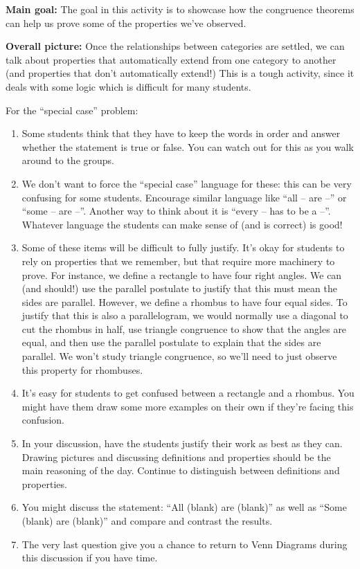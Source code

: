 \documentclass[nooutcomes,noauthor, handout]{ximera}
\begin{document}
\pagebreak

\begin{instructorNotes}
{\bf Main goal: } The goal in this activity is to showcase how the congruence theorems can help us prove some of the properties we've observed.


{\bf Overall picture:} Once the relationships between categories are settled, we can talk about properties that automatically extend from one category to another (and properties that don't automatically extend!)  This is a tough activity, since it deals with some logic which is difficult for many students.

For the ``special case'' problem:
\begin{enumerate}
\item Some students think that they have to keep the words in order and answer whether the statement is true or false.  You can watch out for this as you walk around to the groups.
\item We don't want to force the ``special case'' language for these: this can be very confusing for some students. Encourage similar language like ``all -- are --'' or ``some -- are --''. Another way to think about it is ``every -- has to be a --''. Whatever language the students can make sense of (and is correct) is good!
\item Some of these items will be difficult to fully justify. It's okay for students to rely on properties that we remember, but that require more machinery to prove. For instance, we define a rectangle to have four right angles. We can (and should!) use the parallel postulate to justify that this must mean the sides are parallel. However, we define a rhombus to have four equal sides. To justify that this is also a parallelogram, we would normally use a diagonal to cut the rhombus in half, use triangle congruence to show that the angles are equal, and then use the parallel postulate to explain that the sides are parallel. We won't study triangle congruence, so we'll need to just observe this property for rhombuses.
\item It's easy for students to get confused between a rectangle and a rhombus.  You might have them draw some more examples on their own if they're facing this confusion.
\item In your discussion, have the students justify their work as best as they can. Drawing pictures and discussing definitions and properties should be the main reasoning of the day. Continue to distinguish between definitions and properties.
\item You might discuss the statement: ``All (blank) are (blank)'' as well as ``Some (blank) are (blank)'' and compare and contrast the results.
\item The very last question give you a chance to return to Venn Diagrams during this discussion if you have time.
\end{enumerate}


\end{instructorNotes}
\end{document}
